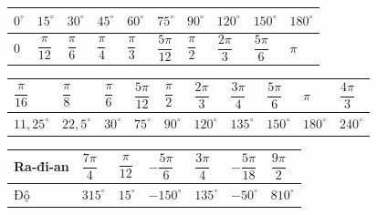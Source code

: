 \begin{bt}
\begin{center}
\begin{tabular}
			\hline
		\end{tabular}
	\end{center}
	\loigiai
	{
		\begin{center}
			\renewcommand{\arraystretch}{2}
			\begin{tabular}{|>{\centering\arraybackslash}m{1cm}|>{\centering\arraybackslash}m{1cm}|>{\centering\arraybackslash}m{1cm}|>{\centering\arraybackslash}m{1cm}|>{\centering\arraybackslash}m{1cm}|>{\centering\arraybackslash}m{1cm}|>{\centering\arraybackslash}m{1cm}|>{\centering\arraybackslash}m{1cm}|>{\centering\arraybackslash}m{1cm}|>{\centering\arraybackslash}m{1cm}|}
				\hline
				$0^\circ$ & $15^\circ$ & $30^\circ$ & $45^\circ$ & $60^\circ$ & $75^\circ$ & $90^\circ$ & $120^\circ$ & $150^\circ$ & $180^\circ$\\
				\hline
				$0$ & $\dfrac{\pi}{12}$ & $\dfrac{\pi}{6}$ & $\dfrac{\pi}{4}$ & $\dfrac{\pi}{3}$ & $\dfrac{5\pi}{12}$ & $\dfrac{\pi}{2}$ & $\dfrac{2\pi}{3}$ & $\dfrac{5\pi}{6}$ & $\pi$\\
				\hline
			\end{tabular}
		\end{center}
		\begin{center}
			\renewcommand{\arraystretch}{2}
			\begin{tabular}{|>{\centering\arraybackslash}m{1cm}|>{\centering\arraybackslash}m{1cm}|>{\centering\arraybackslash}m{1cm}|>{\centering\arraybackslash}m{1cm}|>{\centering\arraybackslash}m{1cm}|>{\centering\arraybackslash}m{1cm}|>{\centering\arraybackslash}m{1cm}|>{\centering\arraybackslash}m{1cm}|>{\centering\arraybackslash}m{1cm}|>{\centering\arraybackslash}m{1cm}|}
				\hline
				$\dfrac{\pi}{16}$ & $\dfrac{\pi}{8}$ & $\dfrac{\pi}{6}$ & $\dfrac{5\pi}{12}$ & $\dfrac{\pi}{2}$ & $\dfrac{2\pi}{3}$ & $\dfrac{3\pi}{4}$ & $\dfrac{5\pi}{6}$ & $\pi$ & $\dfrac{4\pi}{3}$\\
				\hline
				$11{,}25^\circ$ & $22{,}5^\circ$ & $30^\circ$ & $75^\circ$ & $90^\circ$ & $120^\circ$ & $135^\circ$ & $150^\circ$ & $180^\circ$ & $240^\circ$\\
				\hline
			\end{tabular}
		\end{center}
		\begin{center}
			\renewcommand{\arraystretch}{2}
			\begin{tabular}{|>{\centering\arraybackslash}m{2cm}|>{\centering\arraybackslash}m{2cm}|>{\centering\arraybackslash}m{2cm}|>{\centering\arraybackslash}m{2cm}|>{\centering\arraybackslash}m{2cm}|>{\centering\arraybackslash}m{2cm}|>{\centering\arraybackslash}m{2cm}|}
				\hline
				Ra-đi-an & $\dfrac{7\pi}{4}$ & $\dfrac{\pi}{12}$ & $-\dfrac{5\pi}{6}$ & $\dfrac{3\pi}{4}$ & $-\dfrac{5\pi}{18}$ & $\dfrac{9\pi}{2}$\\
				\hline
				Độ & $315^\circ$ & $15^\circ$ & $-150^\circ$ & $135^\circ$ & $-50^\circ$ & $810^\circ$\\
				\hline
			\end{tabular}
		\end{center}
	}
\end{bt}

